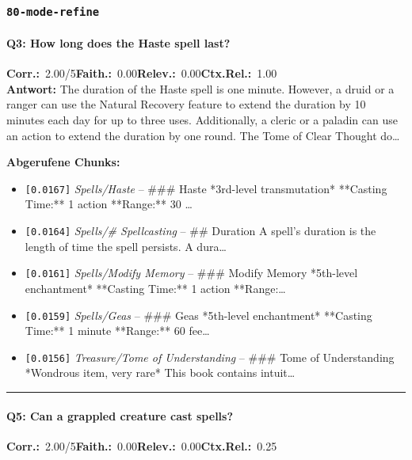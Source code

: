 \subsubsection*{\texttt{80-mode-refine}}
\label{app:samples:80_mode_refine}

\paragraph{Q3: How long does the Haste spell last?}
\noindent \textbf{Corr.:}~2.00/5\quad \textbf{Faith.:}~0.00\quad \textbf{Relev.:}~0.00\quad \textbf{Ctx.Rel.:}~1.00\\

\noindent\textbf{Antwort:} The duration of the Haste spell is one minute. However, a druid or a ranger can use the Natural Recovery feature to extend the duration by 10 minutes each day for up to three uses. Additionally, a cleric or a paladin can use an action to extend the duration by one round. The Tome of Clear Thought do\ldots

\noindent\textbf{Abgerufene Chunks:}
\begin{itemize}[noitemsep, topsep=2pt]
  \item[\textbf{\#1}] \texttt{[0.0167]} \textit{Spells/Haste} -- \#\#\# Haste  *3rd-level transmutation*  **Casting Time:** 1 action  **Range:** 30 \ldots
  \item[\textbf{\#2}] \texttt{[0.0164]} \textit{Spells/# Spellcasting} -- \#\# Duration  A spell's duration is the length of time the spell persists. A dura\ldots
  \item[\textbf{\#3}] \texttt{[0.0161]} \textit{Spells/Modify Memory} -- \#\#\# Modify Memory  *5th-level enchantment*  **Casting Time:** 1 action  **Range:\ldots
  \item[\textbf{\#4}] \texttt{[0.0159]} \textit{Spells/Geas} -- \#\#\# Geas  *5th-level enchantment*  **Casting Time:** 1 minute  **Range:** 60 fee\ldots
  \item[\textbf{\#5}] \texttt{[0.0156]} \textit{Treasure/Tome of Understanding} -- \#\#\# Tome of Understanding  *Wondrous item, very rare*  This book contains intuit\ldots
\end{itemize}
\vspace{4pt}
\hrule
\vspace{6pt}

\paragraph{Q5: Can a grappled creature cast spells?}
\noindent \textbf{Corr.:}~2.00/5\quad \textbf{Faith.:}~0.00\quad \textbf{Relev.:}~0.00\quad \textbf{Ctx.Rel.:}~0.25\\

